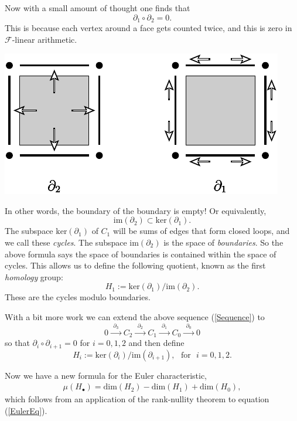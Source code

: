 \documentclass[11pt,twoside,openright]{report}
\newcommand{\Eref}[1]{(\ref{#1})}
\newcommand{\Field}{\mathcal{F}}
\def\Im{\mathrm{im}}
\def\Ker{\mathrm{ker}}
\def\euler{\mu}
\begin{document}
Now with a small amount of thought one finds that 
$$
    \partial_1 \circ \partial_2 = 0.
$$
This is because each vertex around a face gets counted twice,
and this is zero in $\Field$-linear arithmetic.
\begin{center}
\includegraphics{pic-bdy.pdf}
\end{center}
In other words, the boundary of the boundary is empty!
Or equivalently,
$$
    \Im(\partial_2) \subset \Ker(\partial_1).
$$
The subspace $\Ker(\partial_1)$ of $C_1$
will be sums of edges that form closed loops, and we
call these \emph{cycles}.
The subspace $\Im(\partial_2)$ is the space of \emph{boundaries}.
So the above formula
says the space of boundaries is contained within the space of cycles.
This allows us to define the following quotient,
known as the first \emph{homology} group:
$$
    H_1 := \Ker(\partial_1) / \Im(\partial_2).
$$
These are the cycles modulo boundaries.

With a bit more work we can extend the above sequence \Eref{Sequence} to
$$
  0 \xrightarrow{\ \ \partial_3\ \ } 
    C_2 \xrightarrow{\ \ \partial_2\ \ } 
    C_1 \xrightarrow{\ \ \partial_1\ \ } 
    C_0 \xrightarrow{\ \ \partial_0\ \ } 0
$$
so that $\partial_i \circ \partial_{i+1}=0$ 
for $i=0,1,2$
and then define
$$
    H_i := \Ker(\partial_i) / \Im(\partial_{i+1}),\ \ \ \mbox{for}\ \ \ i=0,1,2.
$$

Now we have a new formula for the Euler characteristic,
\begin{align}\label{EulerHom}
    \euler(H_{\bullet}) = \mbox{dim}(H_2) - \mbox{dim}(H_1) + \mbox{dim}(H_0),
\end{align}
which follows from
an application of the rank-nullity theorem to
equation \Eref{EulerEq}.
\end{document}
